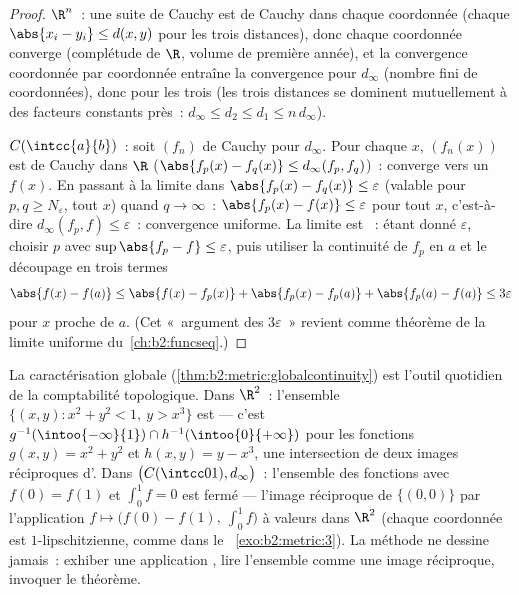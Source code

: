 \begin{proof}
$\R^n$~: une suite de Cauchy est de Cauchy dans chaque coordonnée
(chaque $\abs{x_i - y_i} \leq d(x,y)$ pour les trois distances), donc
chaque coordonnée converge (complétude de $\R$, volume de première
année), et la convergence coordonnée par coordonnée entraîne la
convergence pour $d_\infty$ (nombre fini de coordonnées), donc pour
les trois (les trois distances se dominent mutuellement à des
facteurs constants près~: $d_\infty \leq d_2 \leq d_1 \leq
n\,d_\infty$).

$C(\intcc{a}{b})$~: soit $(f_n)$ de Cauchy pour $d_\infty$. Pour
chaque $x$, $(f_n(x))$ est de Cauchy dans $\R$ ($\abs{f_p(x) -
f_q(x)} \leq d_\infty(f_p, f_q)$)~: converge vers un $f(x)$. En
passant à la limite dans $\abs{f_p(x) - f_q(x)} \leq \varepsilon$
(valable pour $p, q \geq N_\varepsilon$, tout $x$) quand $q \to
\infty$~: $\abs{f_p(x) - f(x)} \leq \varepsilon$ pour tout $x$,
c'est-à-dire $d_\infty(f_p, f) \leq \varepsilon$~: convergence
uniforme. La limite est ~: étant donné $\varepsilon$,
choisir $p$ avec $\sup\abs{f_p - f} \leq \varepsilon$, puis utiliser
la continuité de $f_p$ en $a$ et le découpage en trois termes
\[
\abs{f(x) - f(a)} \leq \abs{f(x) - f_p(x)} + \abs{f_p(x) - f_p(a)}
+ \abs{f_p(a) - f(a)} \leq 3\varepsilon
\]
pour $x$ proche de $a$. (Cet «~argument des $3\varepsilon$~» revient
comme théorème de la limite uniforme du~\cref{ch:b2:funcseq}.)
\end{proof}

\begin{example}\label{ex:b2:metric:recognize}
La caractérisation globale
(\cref{thm:b2:metric:globalcontinuity}) est l'outil quotidien de la
comptabilité topologique. Dans $\R^2$~: l'ensemble $\{(x, y) : x^2 +
y^2 < 1,\ y > x^3\}$ est  --- c'est $g^{-1}(\intoo{-\infty}{1})
\cap h^{-1}(\intoo{0}{+\infty})$ pour les fonctions  $g(x,y)
= x^2 + y^2$ et $h(x, y) = y - x^3$, une intersection de deux images
réciproques d'. Dans $\bigl(C(\intcc01), d_\infty\bigr)$~:
l'ensemble des fonctions avec $f(0) = f(1)$ et $\int_0^1 f = 0$ est
fermé --- l'image réciproque de $\{(0,0)\}$ par l'application 
$f \mapsto \bigl(f(0) - f(1),\ \int_0^1 f\bigr)$ à valeurs dans $\R^2$
(chaque coordonnée est $1$-lipschitzienne, comme dans le~%
\cref{exo:b2:metric:3}). La méthode ne dessine jamais~: exhiber une
application , lire l'ensemble comme une image réciproque,
invoquer le théorème.
\end{example}

